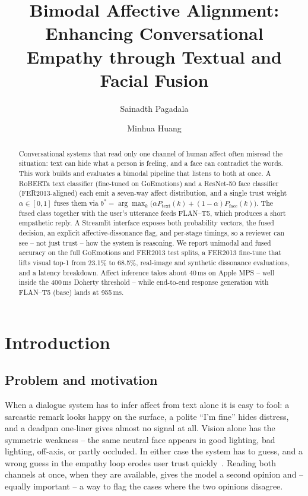 \documentclass[sigconf,nonacm]{acmart}
\title[Bimodal Affective Alignment]{Bimodal Affective Alignment: Enhancing Conversational Empathy through Textual and Facial Fusion}
\author{Sainadth Pagadala}
\affiliation{%
    \department{College of Engineering and Computer Science}
    \institution{Texas A\&M University--Corpus Christi}
    \city{Corpus Christi}
    \state{TX}
    \postcode{78412}
    \country{USA}}
\author{Minhua Huang}
\affiliation{%
    \department{College of Engineering and Computer Science}
    \institution{Texas A\&M University--Corpus Christi}
    \city{Corpus Christi}
    \state{TX}
    \postcode{78412}
    \country{USA}}
\begin{document}
  \begin{abstract}
  Conversational systems that read only one channel of human affect often misread the situation: text can hide what a person is feeling, and a face can contradict the words. This work builds and evaluates a bimodal pipeline that listens to both at once. A RoBERTa text classifier (fine-tuned on GoEmotions) and a ResNet-50 face classifier (FER2013-aligned) each emit a seven-way affect distribution, and a single trust weight $\alpha\in[0,1]$ fuses them via
  $b^*=\arg\max_k\bigl(\alpha P_\text{text}(k)+(1\!-\!\alpha)P_\text{face}(k)\bigr)$.
  The fused class together with the user's utterance feeds FLAN--T5, which produces a short empathetic reply. A Streamlit interface exposes both probability vectors, the fused decision, an explicit affective-dissonance flag, and per-stage timings, so a reviewer can see -- not just trust -- how the system is reasoning. We report unimodal and fused accuracy on the full GoEmotions and FER2013 test splits, a FER2013 fine-tune that lifts visual top-1 from 23.1\% to 68.5\%, real-image and synthetic dissonance evaluations, and a latency breakdown. Affect inference takes about 40\,ms on Apple MPS -- well inside the 400\,ms Doherty threshold -- while end-to-end response generation with FLAN--T5 (base) lands at 955\,ms.
  \end{abstract}

  \maketitle

  \section{Introduction}
  \subsection{Problem and motivation}
  When a dialogue system has to infer affect from text alone it is easy to fool: a sarcastic remark looks happy on the surface, a polite ``I'm fine'' hides distress, and a deadpan one-liner gives almost no signal at all. Vision alone has the symmetric weakness -- the same neutral face appears in good lighting, bad lighting, off-axis, or partly occluded. In either case the system has to guess, and a wrong guess in the empathy loop erodes user trust quickly~\cite{card1983human}. Reading both channels at once, when they are available, gives the model a second opinion and -- equally important -- a way to flag the cases where the two opinions disagree.
\end{document}
